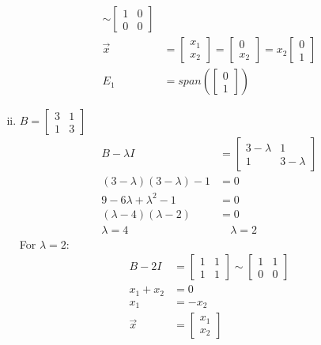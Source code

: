 \documentclass{math}
\begin{document}
\begin{enumerate}[(i)]
\begin{align*}
      \sim \begin{bmatrix}1 & 0 \\ 0 & 0\end{bmatrix} \\
    \vec{x} &= \begin{bmatrix}x_1 \\ x_2\end{bmatrix}
      = \begin{bmatrix}0 \\ x_2\end{bmatrix}
      = x_2\begin{bmatrix}0 \\ 1\end{bmatrix} \\
    E_1 &= span\left(\begin{bmatrix}0 \\ 1\end{bmatrix}\right)
  \end{align*}
  \item \( B = \begin{bmatrix}3 & 1 \\ 1 & 3\end{bmatrix} \)
  \begin{align*}
    B-\lambda I &= \begin{bmatrix}
      3-\lambda & 1 \\
      1 & 3-\lambda
    \end{bmatrix} \\
    (3-\lambda)(3-\lambda)-1 &= 0 \\
    9-6\lambda+\lambda^2-1 &= 0 \\
    (\lambda-4)(\lambda-2) &= 0 \\
    \lambda = 4 &\quad \lambda = 2
  \end{align*}
  For \( \lambda = 2 \):
  \begin{align*}
    B-2I &= \begin{bmatrix}1 & 1 \\ 1 & 1\end{bmatrix}
      \sim \begin{bmatrix}1 & 1 \\ 0 & 0\end{bmatrix} \\
    x_1+x_2 &= 0 \\
    x_1 &= -x_2 \\
    \vec{x} &= \begin{bmatrix}x_1 \\ x_2\end{bmatrix}

\end{align*}
\end{enumerate}
\end{document}
